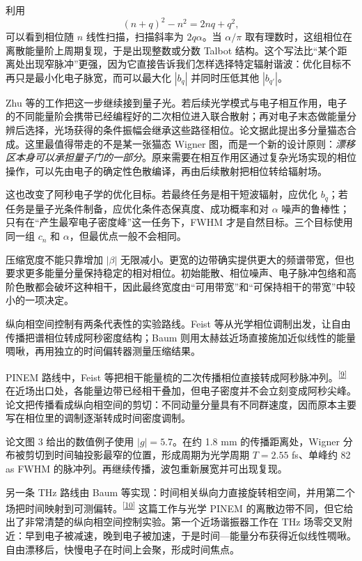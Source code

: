 利用
\begin{equation}
(n+q)^2-n^2=2nq+q^2,
\end{equation}
可以看到相位随 $n$ 线性扫描，扫描斜率为 $2q\alpha$。当 $\alpha/\pi$ 取有理数时，这组相位在离散能量阶上周期复现，于是出现整数或分数 Talbot 结构。这个写法比“某个距离处出现窄脉冲”更强，因为它直接告诉我们怎样选择特定辐射谐波：优化目标不再只是最小化电子脉宽，而可以最大化 $|b_q|$ 并同时压低其他 $|b_{q'}|$。

Zhu 等的工作把这一步继续接到量子光。若后续光学模式与电子相互作用，电子的不同能量阶会携带已经编程好的二次相位进入联合散射；再对电子末态做能量分辨后选择，光场获得的条件振幅会继承这些路径相位。论文据此提出多分量猫态合成。这里最值得带走的不是某一张猫态 Wigner 图，而是一个新的设计原则：\emph{漂移区本身可以承担量子门的一部分}。原来需要在相互作用区通过复杂光场实现的相位操作，可以先由电子的确定性色散编译，再由后续散射把相位转给辐射场。

这也改变了阿秒电子学的优化目标。若最终任务是相干短波辐射，应优化 $b_q$；若任务是量子光条件制备，应优化条件态保真度、成功概率和对 $\alpha$ 噪声的鲁棒性；只有在“产生最窄电子密度峰”这一任务下，FWHM 才是自然目标。三个目标使用同一组 $c_n$ 和 $\alpha$，但最优点一般不会相同。

压缩宽度不能只靠增加 $|\beta|$ 无限减小。更宽的边带确实提供更大的频谱带宽，但也要求更多能量分量保持稳定的相对相位。初始能散、相位噪声、电子脉冲包络和高阶色散都会破坏这种相干，因此最终宽度由“可用带宽”和“可保持相干的带宽”中较小的一项决定。


纵向相空间控制有两条代表性的实验路线。Feist 等从光学相位调制出发，让自由传播把谱相位转成阿秒密度结构；Baum 则用太赫兹近场直接施加近似线性的能量啁啾，再用独立的时间偏转器测量压缩结果。

PINEM 路线中，Feist 等把相干能量梳的二次传播相位直接转成阿秒脉冲列。\textsuperscript{\hyperref[ch02-ref1]{[9]}}
在近场出口处，各能量边带已经相干叠加，但电子密度并不会立刻变成阿秒尖峰。论文把传播看成纵向相空间的剪切：不同动量分量具有不同群速度，因而原本主要写在相位里的调制逐渐转成时间密度调制。

论文图 3 给出的数值例子使用 $|g|=5.7$。在约 1.8 mm 的传播距离处，Wigner 分布被剪切到时间轴投影最窄的位置，形成周期为光学周期 $T=2.55$ fs、单峰约 82 as FWHM 的脉冲列。再继续传播，波包重新展宽并可出现复现。


另一条 THz 路线由 Baum 等实现：时间相关纵向力直接旋转相空间，并用第二个场把时间映射到可测偏转。\textsuperscript{\hyperref[ch02-ref2]{[10]}}
这篇工作与光学 PINEM 的离散边带不同，但它给出了非常清楚的纵向相空间控制实验。第一个近场谐振器工作在 THz 场零交叉附近：早到电子被减速，晚到电子被加速，于是时间—能量分布获得近似线性啁啾。自由漂移后，快慢电子在时间上会聚，形成时间焦点。

